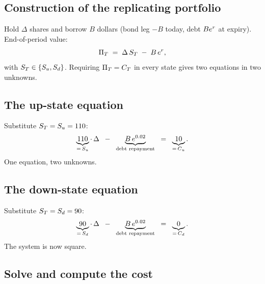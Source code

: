 \subsection{Construction of the replicating portfolio}
\label{subsec:ch15_binomial_construct}

Hold $\Delta$ shares and borrow $B$ dollars (bond leg $-B$
today, debt $Be^{r}$ at expiry). End-of-period value:
\begin{equation}
  \Pi_T \;=\; \Delta\,S_T \;-\; B\,e^{r},
  \label{eq:bin_portfolio}
\end{equation}
with $S_T \in \{S_u, S_d\}$. Requiring $\Pi_T = C_T$
in every state gives two equations in two unknowns.

\subsection{The up-state equation}
\label{subsec:ch15_binomial_up}

Substitute $S_T = S_u = 110$:
\begin{equation}
  \underbrace{110}_{=\,S_u}\cdot\,\Delta
  \;\;-\;\;
  \underbrace{B\,e^{0.02}}_{\text{debt repayment}}
  \;\;=\;\;
  \underbrace{10}_{=\,C_u}.
  \label{eq:bin_up_eqn}
\end{equation}
One equation, two unknowns.

\subsection{The down-state equation}
\label{subsec:ch15_binomial_down}

Substitute $S_T = S_d = 90$:
\begin{equation}
  \underbrace{90}_{=\,S_d}\cdot\,\Delta
  \;\;-\;\;
  \underbrace{B\,e^{0.02}}_{\text{debt repayment}}
  \;\;=\;\;
  \underbrace{0}_{=\,C_d}.
  \label{eq:bin_down_eqn}
\end{equation}
The system is now square.

\subsection{Solve and compute the cost}
\label{subsec:ch15_binomial_solve}

